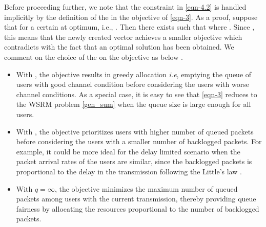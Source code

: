 Before proceeding further, we note that the constraint in \eqref{eqn-4.2} is handled implicitly by the definition of the  in the objective of \eqref{eqn-3}. As a proof, suppose that  for a certain  at optimum, i.e., . Then there exists  such that  where . Since , this means that the newly created vector  achieves a smaller objective which contradicts with the fact that an optimal solution has been obtained. We comment on the choice of  the  on the objective as below \cite{berry2004cross,qps_cioffi}.
\begin{itemize}
\item With , the objective results in greedy allocation \textit{i.e}, emptying the queue of users with good channel condition before considering the users with worse channel conditions. As a special case, it is easy to see that \eqref{eqn-3} reduces to the \ac{WSRM} problem \eqref{gen_sum} when the queue size is large enough for all users.
\item With , the objective prioritizes users with higher number of queued packets before considering the users with a smaller number of backlogged packets. For example, it could be more ideal for the delay limited scenario when the packet arrival rates of the users are similar, since the backlogged packets is proportional to the delay in the transmission following the Little's law \cite{neely2010stochastic}.
\item With \(q = \infty \), the objective minimizes the maximum number of queued packets among users with the current transmission, thereby providing queue fairness by allocating the resources proportional to the number of backlogged packets.
\end{itemize}
